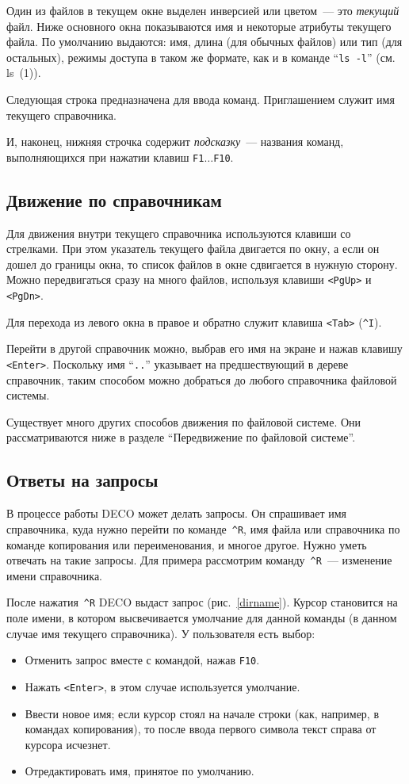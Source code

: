 Один из файлов в текущем окне выделен инверсией или цветом~--- это
{\em текущий} файл. Ниже основного окна показываются имя и
некоторые атрибуты текущего файла.
По умолчанию выдаются: имя, длина (для обычных файлов)
или тип (для остальных), режимы доступа в таком же формате, как и
в команде ``{\tt ls~-l}'' (см. ls~(1)).

Следующая строка предназначена для ввода команд.
Приглашением служит имя текущего справочника.

И, наконец, нижняя строчка содержит {\em подсказку}~---
названия команд, выполняющихся при нажатии клавиш {\tt F1}$\ldots${\tt F10}.

\subsection{Движение по справочникам}

Для движения внутри текущего справочника используются
клавиши со стрелками. При этом указатель текущего файла
двигается по окну, а если он дошел до границы окна, то список файлов в
окне сдвигается в нужную сторону. Можно передвигаться сразу на много файлов,
используя клавиши {\tt <PgUp>} и {\tt <PgDn>}.

Для перехода из левого окна в правое и обратно служит клавиша {\tt <Tab>}
({\tt \^{}I}).

Перейти в другой справочник можно, выбрав его имя на экране и нажав
клавишу {\tt <Enter>}. Поскольку имя ``{\tt ..}'' указывает на
предшествующий в дереве справочник, таким способом можно
добраться до любого справочника файловой системы.

Существует много других способов движения по файловой системе.
Они рассматриваются ниже в разделе ``Передвижение по файловой системе''.

\subsection{Ответы на запросы}

В процессе работы DECO может делать запросы.
Он спрашивает имя справочника, куда нужно перейти по команде~{\tt \^{}R},
имя файла или справочника по команде копирования или
переименования, и многое другое. Нужно уметь отвечать на такие запросы.
Для примера рассмотрим команду~{\tt \^{}R}~--- изменение имени справочника.


После нажатия~{\tt \^{}R} DECO выдаст запрос (рис.~\ref{dirname}).
Курсор становится на поле имени, в котором
высвечивается умолчание для данной команды (в данном случае
имя текущего справочника). У пользователя есть выбор:
\begin{itemize}
\item
Отменить запрос вместе с командой, нажав {\tt F10}.
\item
Нажать {\tt <Enter>}, в этом случае используется умолчание.
\item
Ввести новое имя; если курсор стоял на начале строки (как, например, в
командах копирования), то
после ввода первого символа текст справа от
курсора исчезнет.
\item
Отредактировать имя, принятое по умолчанию.
\end{itemize}

